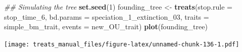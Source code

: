 \documentclass[
]{book}
\newenvironment{Shaded}{\begin{snugshade}}{\end{snugshade}}
\newcommand{\CommentTok}[1]{\textcolor[rgb]{0.56,0.35,0.01}{\textit{#1}}}
\newcommand{\DataTypeTok}[1]{\textcolor[rgb]{0.13,0.29,0.53}{#1}}
\newcommand{\DecValTok}[1]{\textcolor[rgb]{0.00,0.00,0.81}{#1}}
\newcommand{\KeywordTok}[1]{\textcolor[rgb]{0.13,0.29,0.53}{\textbf{#1}}}
\newcommand{\NormalTok}[1]{#1}
\newcommand{\StringTok}[1]{\textcolor[rgb]{0.31,0.60,0.02}{#1}}
\begin{document}
\begin{Shaded}
\begin{Highlighting}[]
\CommentTok{\#\# Simulating the tree}
\KeywordTok{set.seed}\NormalTok{(}\DecValTok{1}\NormalTok{)}
\NormalTok{founding\_tree \textless{}{-}}\StringTok{ }\KeywordTok{treats}\NormalTok{(}\DataTypeTok{stop.rule =}\NormalTok{ stop\_time\_}\DecValTok{6}\NormalTok{,}
                      \DataTypeTok{bd.params =}\NormalTok{ speciation\_}\DecValTok{1}\NormalTok{\_extinction\_}\DecValTok{03}\NormalTok{,}
                      \DataTypeTok{traits    =}\NormalTok{ simple\_bm\_trait,}
                      \DataTypeTok{events    =}\NormalTok{ new\_OU\_trait)}
\KeywordTok{plot}\NormalTok{(founding\_tree)}
\end{Highlighting}
\end{Shaded}

\texttt{[image: treats\_manual\_files/figure-latex/unnamed-chunk-136-1.pdf]}

  
\end{document}
